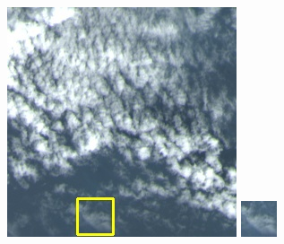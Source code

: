 \documentclass[10pt]{ctexart}
\begin{document}
\begin{multicols}{2}
\begin{figure}[H]
{\begin{minipage}[b]{0.15\linewidth}
            \includegraphics[width=1\linewidth]{../log/spoon2/cut2/LC81620432014072LGN00_16237_color.jpg}\vspace{4pt}
            \includegraphics[width=1\linewidth]{../log/spoon2/cut2/tmp_cut_LC81620432014072LGN00_16237_color.jpg}\vspace{4pt}

\end{minipage}}
\end{figure}
\end{multicols}
\end{document}
